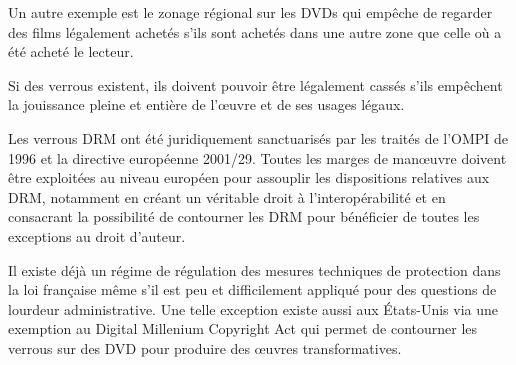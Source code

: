 Un autre exemple est le zonage régional sur les DVDs qui empêche de regarder des films légalement achetés s'ils sont achetés dans une autre zone que celle où a été acheté le lecteur.

\begin{mesure}
Si des verrous existent, ils doivent pouvoir être légalement cassés s'ils empêchent la jouissance pleine et entière de l'œuvre et de ses usages légaux. 
\end{mesure}

Les verrous DRM ont été juridiquement sanctuarisés par les traités de l’OMPI de 1996 et la directive européenne 2001/29. Toutes les marges de manœuvre doivent être exploitées au niveau européen pour assouplir les dispositions relatives aux DRM, notamment en créant un véritable droit à l'interopérabilité et en consacrant la possibilité de contourner les DRM pour bénéficier de toutes les exceptions au droit d'auteur.  

Il existe déjà un régime de régulation des mesures techniques de protection dans la loi française même s’il est peu et difficilement appliqué pour des questions de lourdeur administrative. Une telle exception existe aussi aux États-Unis via une exemption au Digital Millenium Copyright Act qui permet de contourner les verrous sur des DVD pour produire des œuvres transformatives.


